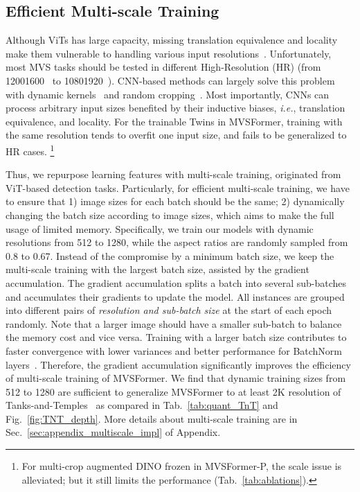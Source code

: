 \documentclass[10pt]{article} \usepackage[preprint]{tmlr}
\begin{document}
\subsection{Efficient Multi-scale Training}
\label{sec:multi_scale_training}
Although ViTs has large capacity, missing translation equivalence and locality make them vulnerable to handling various input resolutions~\citep{xu2021vitae}. Unfortunately, most MVS tasks should be tested in different High-Resolution (HR) (from 12001600~\citep{aanaes2016large} to 10801920~\citep{Knapitsch2017}). CNN-based methods can largely solve this problem with dynamic kernels~\citep{giang2021curvature} and random cropping~\citep{mi2021generalized}. Most importantly, CNNs can process arbitrary input sizes benefited by their inductive biases, \emph{i.e.}, translation equivalence, and locality.
For the trainable Twins in MVSFormer, training with the same resolution tends to overfit one input size, and fails to be generalized to HR cases.
\footnote{\scriptsize{For multi-crop augmented DINO frozen in MVSFormer-P, the scale issue is alleviated; but it still limits the performance (Tab.~\ref{tab:ablations}).}}


Thus, we repurpose learning features with multi-scale training,  originated from ViT-based detection tasks. Particularly, for efficient multi-scale training, we have to ensure that 1) image sizes for each batch should be the same; 2) dynamically changing the batch size according to image sizes, which aims to make the full usage of limited memory. 
Specifically, we train our models with dynamic resolutions from 512 to 1280, while the aspect ratios are randomly sampled from 0.8 to 0.67.
Instead of the compromise by a minimum batch size, we keep the multi-scale training with the largest batch size, assisted by the gradient accumulation. 
The gradient accumulation splits a batch into several sub-batches and accumulates their gradients to update the model. 
All instances are grouped into different pairs of \emph{resolution and sub-batch size} at the start of each epoch randomly.
Note that a larger image should have a smaller sub-batch to balance the memory cost and vice versa.
Training with a larger batch size contributes to faster convergence with lower variances and better performance for BatchNorm layers~\citep{ioffe2017batch}. Therefore, the gradient accumulation significantly improves the efficiency of  multi-scale training of MVSFormer. We find that dynamic training sizes from 512 to 1280 are sufficient to generalize MVSFormer to at least 2K resolution of Tanks-and-Temples~\citep{Knapitsch2017} as compared in Tab.~\ref{tab:quant_TnT} and Fig.~\ref{fig:TNT_depth}. 
More details about multi-scale training are  in Sec.~\ref{sec:appendix_multiscale_impl} of Appendix.
\end{document}
